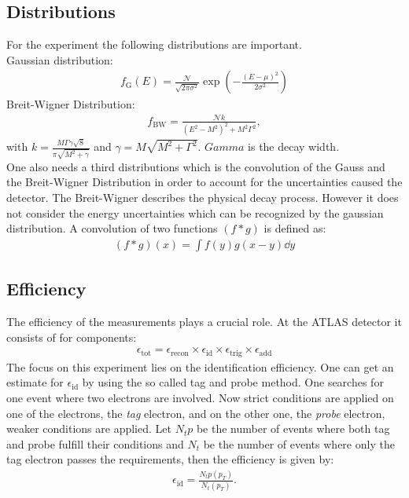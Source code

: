 \documentclass[12pt, a4paper, bibliography=totoc]{scrartcl}
\begin{document}
\begin{multicols}{2}
\subsection{Distributions}
For the experiment the following distributions are important.\\
Gaussian distribution:
\begin{align}
    f_{\text{G}} (E) = \frac{\mathcal{N}}{\sqrt{2 \pi \sigma^2}} \exp \left( - \frac{(E - \mu )^2}{2 \sigma^2} \right)
\end{align}
Breit-Wigner Distribution:
\begin{align}
    f_{\text{BW}} = \frac{\mathcal{N} k}{(E^2 - M^2)^2 + M^2 \Gamma^2} ,
\end{align}
with $k = \frac{M\Gamma \gamma \sqrt{8}}{\pi \sqrt{M^2 + \gamma}}$ and $\gamma = M \sqrt{M^2 + \Gamma^2}$. $Gamma$ is the decay width.\\
One also needs a third distributions which is the convolution of the Gauss and the Breit-Wigner Distribution in order to account for the uncertainties caused the detector.
The Breit-Wigner describes the physical decay process. 
However it does not consider the energy uncertainties which can be recognized by the gaussian distribution.
A convolution of two functions $(f \ast g)$ is defined as:
\begin{align}
    (f \ast g) (x) = \int f(y)g(x-y)\dd y
\end{align}

\subsection{Efficiency}

The efficiency of the measurements plays a crucial role. 
At the ATLAS detector it consists of for components:
\begin{align}
     \epsilon_{\text{tot}} =  \epsilon_{\text{recon}} \times \epsilon_{\text{id}} \times \epsilon_{\text{trig}} \times \epsilon_{\text{add}} 
\end{align}
The focus on this experiment lies on the identification efficiency.
One can get an estimate for $\epsilon_{\text{id}}$ by using the so called tag and probe method.
One searches for one event where two electrons are involved. 
Now strict conditions are applied on one of the electrons, the \textit{tag} electron, 
and on the other one, the \textit{probe} electron, weaker conditions are applied.
Let $N_tp$ be the number of events where both tag and probe fulfill their conditions and $N_t$ be the number of events where only the tag electron passes the requirements, then the efficiency is given by:
\begin{align}
    \epsilon_{\text{id}} = \frac{N_tp (p_T)}{N_t(p_T)}.
\end{align}



\end{multicols}
\end{document}
